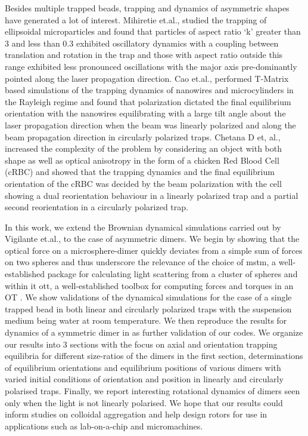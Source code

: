 \documentclass[preprint,  3p]{elsarticle}
\begin{document}
Besides multiple trapped beads, trapping and dynamics of asymmetric shapes have generated a lot of interest. Mihiretie et.al., \cite{Loudet_2014} studied the trapping of ellipsoidal microparticles and found that particles of aspect ratio ‘k’ greater than 3 and less than 0.3 exhibited oscillatory dynamics with a coupling between translation and rotation in the trap and those with aspect ratio outside this range exhibited less pronounced oscillations with the major axis pre-dominantly pointed along the laser propagation direction. Cao et.al., \cite{Curran_1999} performed T-Matrix based simulations of the trapping dynamics of nanowires and microcylinders in the Rayleigh regime and found that polarization dictated the final equilibrium orientation with the nanowires equilibrating with a large tilt angle about the laser propagation direction when the beam was linearly polarized and along the beam propagation direction in circularly polarized traps. Chetana D et, al., \cite{Chetana_2022} increased the complexity of the problem by considering an object with both shape as well as optical anisotropy in the form of a chicken Red Blood Cell (cRBC) and showed that the trapping dynamics and the final equilibrium orientation of the cRBC was decided by the beam polarization with the cell showing a dual reorientation behaviour in a linearly polarized trap and a partial second reorientation in a circularly polarized trap.  

In this work, we extend the Brownian dynamical simulations carried out by Vigilante et.al., \cite{Vigilante_2020} to the case of asymmetric dimers. We begin by showing that the optical force on a microsphere-dimer quickly deviates from a simple sum of forces on two spheres and thus underscore the relevance of the choice of mstm, a well-established package for calculating light scattering from a cluster of spheres \cite{Mackowski_2011} and within it ott, a well-established toolbox for computing forces and torques in an OT \cite{Nieminen_2007}.  We show validations of the dynamical simulations for the case of a single trapped bead in both linear and circularly polarized traps with the suspension medium being water at room temperature. We then reproduce the results for dynamics of a symmetric dimer in \cite{Vigilante_2020} as further validation of our codes. We organize our results into 3 sections with the focus on axial and orientation trapping equilibria for different size-ratios of the dimers in the first section, determinations of equilibrium orientations and equilibrium positions of various dimers with varied initial conditions of orientation and position in linearly and circularly polarised traps.  Finally, we report interesting rotational dynamics of dimers seen only when the light is not linearly polarised. We hope that our results could inform studies on colloidal aggregation and help design rotors for use in applications such as lab-on-a-chip and micromachines.        
\end{document}
